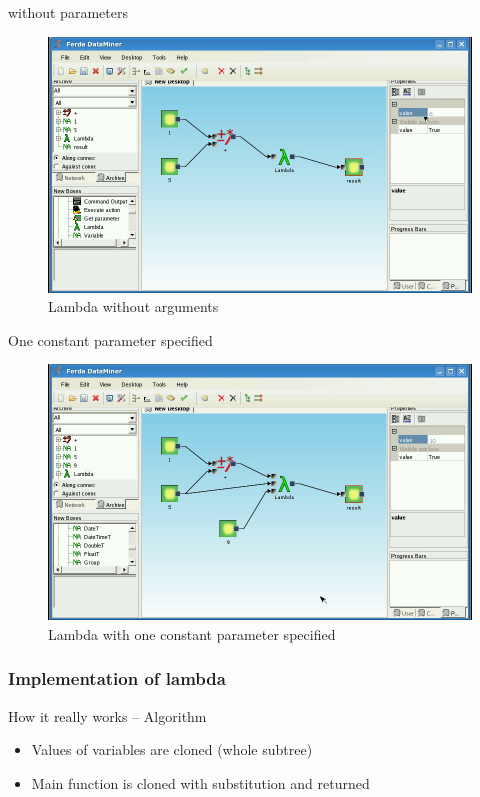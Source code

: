 \documentclass[a4paper,12pt]{book}
\begin{document}
without parameters
\begin{figure}
\includegraphics[width=13.72cm]{lambdaBasic2.png}
	\caption{Lambda without arguments}
\end{figure}

One constant parameter specified
\begin{figure}
\includegraphics[width=13.72cm]{lambdaBasic3.png}
	\caption{Lambda with one constant parameter specified}
\end{figure}
	
\subsubsection{Implementation of lambda}
How it really works -- Algorithm
\begin{itemize}
	\item Values of variables are cloned (whole subtree)
	\item Main function is cloned with substitution and returned
\end{itemize}
\end{document}
